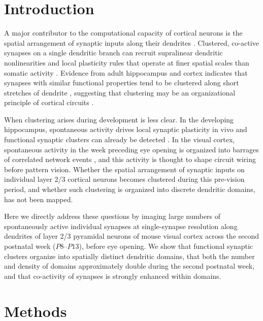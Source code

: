 \documentclass[11pt]{article}
\begin{document}
\section{Introduction}

A major contributor to the computational capacity of cortical neurons is the spatial arrangement of synaptic inputs along their dendrites \cite{hausser2001diversity,poirazi2003pyramidal,larkum2004active}. Clustered, co-active synapses on a single dendritic branch can recruit supralinear dendritic nonlinearities and local plasticity rules that operate at finer spatial scales than somatic activity \cite{losonczy2008compartment,golding2002dendritic,govindarajan2011memory,magee1997synaptic}. Evidence from adult hippocampus and cortex indicates that synapses with similar functional properties tend to be clustered along short stretches of dendrite \cite{iacaruso2017synaptic,scholl2017local,wilson2016division,kerlin2019functional,fu2012repetitive}, suggesting that clustering may be an organizational principle of cortical circuits \cite{yuste2011dendritic}.

When clustering arises during development is less clear. In the developing hippocampus, spontaneous activity drives local synaptic plasticity in vivo \cite{winnubst2015} and functional synaptic clusters can already be detected \cite{kleindienst2011clustered}. In the visual cortex, spontaneous activity in the week preceding eye opening is organized into barrages of correlated network events \cite{garaschuk2000calcium,khazipov2004early,siegel2012peripheral,allene2008sequential,cline2008spontaneous,katz1996synaptic}, and this activity is thought to shape circuit wiring before pattern vision. Whether the spatial arrangement of synaptic inputs on individual layer 2/3 cortical neurons becomes clustered during this pre-vision period, and whether such clustering is organized into discrete dendritic domains, has not been mapped.

Here we directly address these questions by imaging large numbers of spontaneously active individual synapses at single-synapse resolution along dendrites of layer 2/3 pyramidal neurons of mouse visual cortex across the second postnatal week ($P8$--$P13$), before eye opening. We show that functional synaptic clusters organize into spatially distinct dendritic domains, that both the number and density of domains approximately double during the second postnatal week, and that co-activity of synapses is strongly enhanced within domains.

\section{Methods}
\end{document}
